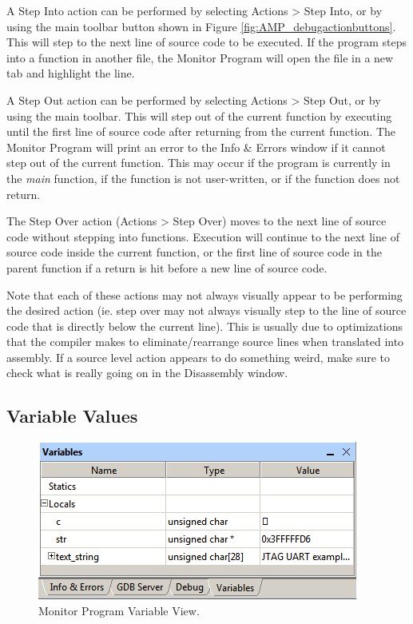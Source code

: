 \documentclass[11pt, twoside, pdftex]{article}
\begin{document}
A Step Into action can be performed by selecting {\sf Actions > Step Into}, or by using the main toolbar button shown in Figure \ref{fig:AMP_debugactionbuttons}.
This will step to the next line of source code to be executed. If the program steps into a function in another file, the Monitor
Program will open the file in a new tab and highlight the line.

A Step Out action can be performed by selecting {\sf Actions > Step Out}, or by using the main toolbar. This will step out of the current function 
by executing until the first line of source code after returning from the current function. The Monitor Program will print an error to the
{\sf Info \& Errors} window if it cannot step out of the current function. This may occur if the program is currently in the
{\it main} function, if the function is not user-written, or if the function does not return. 

The Step Over action ({\sf Actions > Step Over}) moves to the next line of source code without stepping into functions. 
Execution will continue to the next line of source code inside the current function, or the first line of source code
in the parent function if a return is hit before a new line of source code.

Note that each of these actions may not always visually appear to be performing the desired action (ie. step over may not always
visually step to the line of source code that is directly below the current line). This is usually due to optimizations that
the compiler makes to eliminate/rearrange source lines when translated into assembly. If a source level action appears to do
something weird, make sure to check what is really going on in the {\sf Disassembly} window.

\subsection{Variable Values}

\begin{figure}[h]
	\begin{center}
		\includegraphics[scale=0.7]{screenshots/AMP_variablevalues.png}
	\end{center}
	\caption{Monitor Program Variable View.}
	\label{fig:AMP_variablevalues}
\end{figure}
\end{document}
